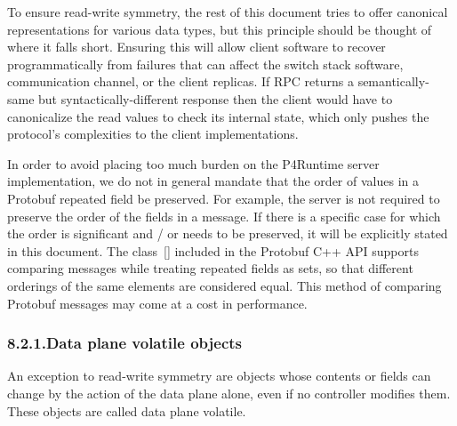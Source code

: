 \documentclass[11pt]{article}
\begin{document}
{%
\noindent{}To ensure read-write symmetry, the rest of this document tries to offer
canonical representations for various data types, but this principle should be
thought of where it falls short. Ensuring this will allow client software to
recover programmatically from failures that can affect the switch stack
software, communication channel, or the client replicas. If  RPC returns a
semantically-same but syntactically-different response then the client would
have to canonicalize the read values to check its internal state, which only
pushes the protocol's complexities to the client implementations.%

In order to avoid placing too much burden on the P4Runtime server
implementation, we do not in general mandate that the order of values in a
Protobuf repeated field be preserved. For example, the server is not required to
preserve the order of the  fields in a  message. If there is
a specific case for which the order is significant and / or needs to be
preserved, it will be explicitly stated in this document. The
 class~[] included in the Protobuf
C++ API supports comparing messages while treating repeated fields as sets, so
that different orderings of the same elements are considered equal. This method
of comparing Protobuf messages may come at a cost in performance.%

\subsubsection{8.2.1.\hspace*{0.5em}Data plane volatile objects}\label{sec-data-plane-volatile-objects}%

\noindent{}An exception to read-write symmetry are objects whose contents or
fields can change by the action of the data plane alone, even if no
controller modifies them.  These objects are called data plane
volatile.%

}
\end{document}
